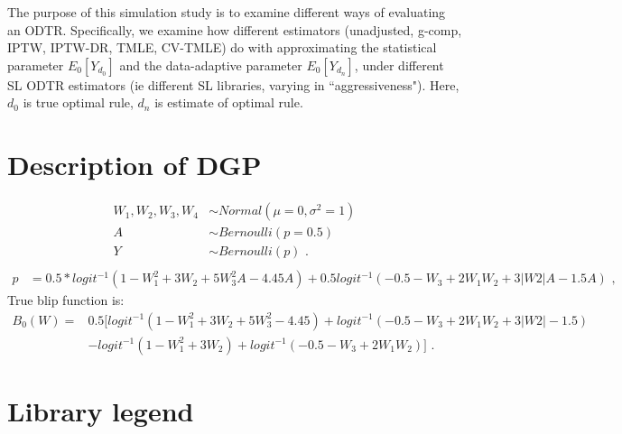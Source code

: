 \documentclass[11pt]{article}\usepackage[]{graphicx}\usepackage[]{color}
\begin{document}
The purpose of this simulation study is to examine different ways of evaluating an ODTR. Specifically, we examine how different estimators (unadjusted, g-comp, IPTW, IPTW-DR, TMLE, CV-TMLE) do with approximating the statistical parameter $E_0[Y_{d_0}]$ and the data-adaptive parameter $E_0[Y_{d_n}]$, under different SL ODTR estimators (ie different SL libraries, varying in ``aggressiveness"). Here, $d_0$ is true optimal rule, $d_n$ is estimate of optimal rule.










\section{Description of DGP}

\begin{align*}
W_1,W_2,W_3,W_4 &\sim Normal(\mu=0,\sigma^2=1) \\
A &\sim Bernoulli(p=0.5) \\
Y &\sim Bernoulli(p) \text{ .}\\
\end{align*}
\begin{align*}
p &= 0.5*logit^{-1} (1-W_1^2  + 3W_2  + 5W_3^2 A - 4.45A)+0.5logit^{-1} (-0.5- W_3  + 2W_1 W_2  + 3|W2|A - 1.5A) \text{ ,}
\end{align*}
True blip function is:
\begin{align*}
    B_0 (W)= & 0.5[logit^{-1} (1-W_1^2  + 3W_2  + 5W_3^2  - 4.45)+logit^{-1} (-0.5- W_3  + 2W_1 W_2  + 3|W2|  - 1.5)\\
& - logit^{-1} (1-W_1^2  + 3W_2 )+logit^{-1} (-0.5- W_3  + 2W_1 W_2 )] \text{ .}
\end{align*}







\section{Library legend}
\end{document}
